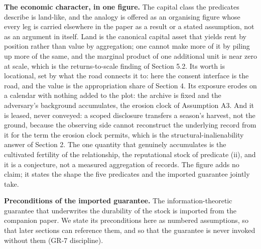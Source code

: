 \documentclass[
  11pt,
]{article}
\begin{document}
\textbf{The economic character, in one figure.} The capital class the
predicates describe is land-like, and the analogy is offered as an
organising figure whose every leg is carried elsewhere in the paper as a
result or a stated assumption, not as an argument in itself. Land is the
canonical capital asset that yields rent by position rather than value
by aggregation; one cannot make more of it by piling up more of the
same, and the marginal product of one additional unit is near zero at
scale, which is the returns-to-scale finding of Section 5.2. Its worth
is locational, set by what the road connects it to: here the consent
interface is the road, and the value is the appropriation share of
Section 4. Its exposure erodes on a calendar with nothing added to the
plot: the archive is fixed and the adversary's background accumulates,
the erosion clock of Assumption A3. And it is leased, never conveyed: a
scoped disclosure transfers a season's harvest, not the ground, because
the observing side cannot reconstruct the underlying record from it for
the term the erosion clock permits, which is the
structural-inalienability answer of Section 2. The one quantity that
genuinely accumulates is the cultivated fertility of the relationship,
the reputational stock of predicate (ii), and it is a conjecture, not a
measured aggregation of records. The figure adds no claim; it states the
shape the five predicates and the imported guarantee jointly take.

\textbf{Preconditions of the imported guarantee.} The
information-theoretic guarantee that underwrites the durability of the
stock is imported from the companion paper. We state its preconditions
here as numbered assumptions, so that later sections can reference them,
and so that the guarantee is never invoked without them (GR-7
discipline).
\end{document}

